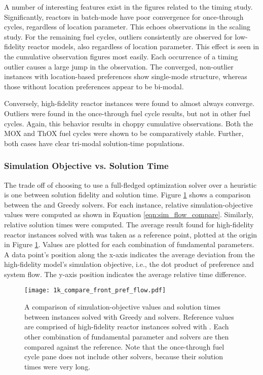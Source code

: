 A number of interesting features exist in the figures related to the \cbc timing
study. Significantly, reactors in batch-mode have poor convergence for
once-through cycles, regardless of location parameter. This echoes observations
in the scaling study. For the remaining fuel cycles, outliers consistently are
observed for low-fidelity reactor models, also regardless of location
parameter. This effect is seen in the cumulative observation figures most
easily. Each occurrence of a timing outlier causes a large jump in the
observation. The converged, non-outlier instances with location-based
preferences show single-mode structure, whereas those without location
preferences appear to be bi-modal.

Conversely, high-fidelity reactor instances were found to almost always
converge. Outliers were found in the once-through fuel cycle results, but not in
other fuel cycles. Again, this behavior results in choppy cumulative
observations. Both the MOX and ThOX fuel cycles were shown to be comparatively
stable. Further, both cases have clear tri-modal solution-time populations.

\subsubsection{Simulation Objective vs. Solution Time}

The trade off of choosing to use a full-fledged optimization solver over a
heuristic is one between solution fidelity and solution time. Figure
\ref{fig:1k_compare_front_pref_flow} shows a comparison between the \cbc and
Greedy solvers. For each instance, relative simulation-objective values were
computed as shown in Equation \ref{eqn:sim_flow_compare}. Similarly, relative
solution times were computed. The average result found for high-fidelity reactor
instances solved with \cbc was taken as a reference point, plotted at the origin
in Figure \ref{fig:1k_compare_front_pref_flow}. Values are plotted for each
combination of fundamental parameters. A data point's position along the x-axis
indicates the average deviation from the high-fidelity model's simulation
objective, i.e., the dot product of preference and system flow. The y-axis
position indicates the average relative time difference.

\begin{figure}[h!]
  \begin{center}
    \texttt{[image: 1k\_compare\_front\_pref\_flow.pdf]}
    \caption{
      \label{fig:1k_compare_front_pref_flow}
      A comparison of simulation-objective values and solution times between
      instances solved with Greedy and \cbc solvers. Reference values are
      comprised of high-fidelity reactor instances solved with \cbc. Each other
      combination of fundamental parameter and solvers are then compared against
      the reference. Note that the once-through fuel cycle pane does not include
      other \cbc solvers, because their solution times were very long.
    }
  \end{center}
\end{figure}

